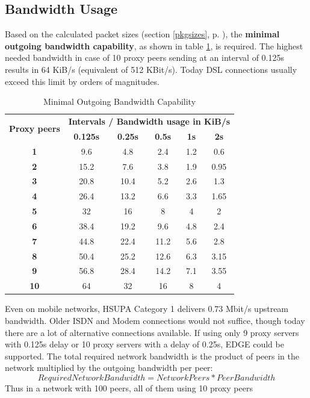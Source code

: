 \subsection{Bandwidth Usage}
\label{bwusagetheory}
Based on the calculated packet sizes (section \ref{pkgsizes}, p. \pageref{pkgsizes}), 
the \textbf{minimal outgoing bandwidth capability}, as shown in table \ref{bandwidth},
is required.
The highest needed bandwidth
in case of 10 proxy peers sending at an interval of 0.125s results in 64 KiB/s
(equivalent of 512 KBit/s).
Today DSL connections usually exceed this limit by orders of magnitudes.
\begin{longtable}{|c|c|c|c|c|c|}
\caption{Minimal Outgoing Bandwidth Capability}
\label{bandwidth}\\
\hline
\multirow{2}{*}{\textbf{Proxy peers}} & \multicolumn{5}{|l|}{\textbf{Intervals / Bandwidth usage in KiB/s}} \\
& \textbf{0.125s} & \textbf{0.25s} & \textbf{0.5s} & \textbf{1s} & \textbf{2s}\\
\hline
\textbf{1} & 9.6 & 4.8 & 2.4 & 1.2 & 0.6\\
\hline
\textbf{2} & 15.2 & 7.6 & 3.8 & 1.9 & 0.95\\
\hline
\textbf{3} & 20.8 & 10.4 & 5.2 & 2.6 & 1.3\\
\hline
\textbf{4} & 26.4 & 13.2 & 6.6 & 3.3 & 1.65\\
\hline
\textbf{5} & 32 & 16 & 8 & 4 & 2\\
\hline
\textbf{6} & 38.4 & 19.2 & 9.6 & 4.8 & 2.4\\
\hline
\textbf{7} & 44.8 & 22.4 & 11.2 & 5.6 & 2.8\\
\hline
\textbf{8} & 50.4 & 25.2 & 12.6 & 6.3 & 3.15\\
\hline
\textbf{9} & 56.8 & 28.4 & 14.2 & 7.1 & 3.55\\
\hline
\textbf{10} & 64 & 32 & 16 & 8 & 4\\
\hline
\end{longtable}
Even on mobile networks, HSUPA Category 1 delivers 0.73 Mbit/s upstream bandwidth.
Older ISDN and Modem connections would not suffice,
though today there are a lot of alternative connections available.\cite{wiki:bitrates}
If using only 9 proxy servers with 0.125s delay or
10 proxy servers with a delay of 0.25s, EDGE could be supported.
The total required network bandwidth is the product of peers in the
network multiplied by the outgoing bandwidth per peer:
$$Required Network Bandwidth = Network Peers * Peer Bandwidth$$
Thus in a network with 100 peers, all of them using 10 proxy peers
